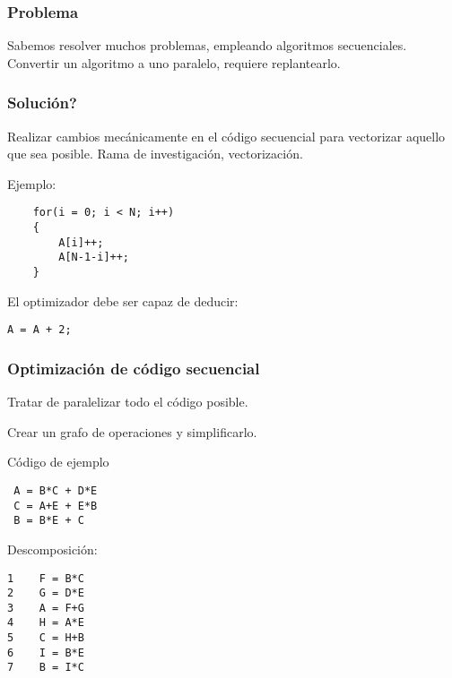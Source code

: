 \documentclass{beamer}
\begin{document}



\begin{frame}
\frametitle{Problema}

Sabemos resolver muchos problemas, empleando algoritmos secuenciales.
Convertir un algoritmo a uno paralelo, requiere replantearlo.

\end{frame}



\begin{frame}[fragile]
\frametitle{Solución?}

Realizar cambios mecánicamente en el código secuencial para vectorizar aquello
que sea posible. Rama de investigación, vectorización.

Ejemplo:

\begin{lstlisting}
    for(i = 0; i < N; i++)
    {
        A[i]++;
        A[N-1-i]++;
    }
\end{lstlisting}

El optimizador debe ser capaz de deducir:

\begin{lstlisting}
A = A + 2;
\end{lstlisting}

\end{frame}



\begin{frame}
\frametitle{Optimización de código secuencial}
Tratar de paralelizar todo el código posible.

Crear un grafo de operaciones y simplificarlo.
\end{frame}



\begin{frame}[fragile]
Código de ejemplo

\begin{lstlisting}
 A = B*C + D*E
 C = A+E + E*B
 B = B*E + C
\end{lstlisting}

Descomposición:

\begin{lstlisting}
1    F = B*C
2    G = D*E
3    A = F+G
4    H = A*E
5    C = H+B
6    I = B*E
7    B = I*C
\end{lstlisting}

\end{frame}
\end{document}
